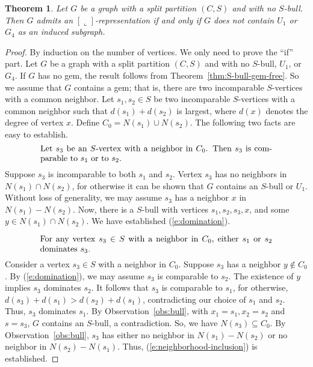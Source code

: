 \documentclass[11pt,3p,times]{elsarticle}
\newenvironment{myproof}{\begin{proof}}{\end{proof}}
\newcommand{\La}{\ensuremath{\llcorner}} \newcommand{\Lb}{\ensuremath{\ulcorner}} \newcommand{\Lc}{\ensuremath{\lrcorner}} \newcommand{\Ld}{\ensuremath{\urcorner}}
\newtheorem{theorem}{Theorem}
\begin{document}
\begin{theorem}\label{thm:bull-free}
Let $G$ be a graph with a split partition $(C,S)$ and with no
$S$-bull. Then $G$ admits an $[\La]$-representation if and only if $G$ does
not contain $U_1$ or $G_4$ as an induced subgraph.
\end{theorem}
\begin{myproof}
By induction on the number of vertices. We
only need to prove the ``if'' part. Let $G$ be a graph with a
split partition $(C,S)$ and with no $S$-bull, $U_1$, or $G_4$.
If $G$ has no gem, the result follows from Theorem~\ref{thm:S-bull-gem-free}.
So we assume that $G$ contains a gem; that is,
there are two incomparable $S$-vertices with a common
neighbor. Let $s_1, s_2 \in S$ be two incomparable $S$-vertices with a
common neighbor such that $d(s_1) + d(s_2)$ is largest, where
$d(x)$ denotes the degree of vertex $x$. Define $C_0 = N(s_1) \cup N(s_2)$.
The following two facts are easy to establish.
\begin{equation}\begin{minipage}{0.8\linewidth}\label{e:domination}
Let $s_3$ be an  $S$-vertex with a neighbor in $C_0$. Then $s_3$ is
comparable to $s_1$ or to $s_2$.
\end{minipage}\end{equation}
Suppose $s_3$ is incomparable
to both $s_1$ and $s_2$. Vertex $s_3$ has no neighbors in $N(s_1)
\cap N(s_2)$, for otherwise it can be shown that $G$ contains
an $S$-bull or $U_1$. Without loss of generality, we may assume
$s_3$ has a neighbor $x$ in $N(s_1) - N(s_2)$. Now, there is a
$S$-bull with vertices $s_1,s_2,s_3,x$, and some $y \in N(s_1)
\cap N(s_2)$. We have established (\ref{e:domination}).


\begin{equation}\begin{minipage}{0.8\linewidth}\label{e:neighborhood-inclusion}
For any vertex $s_3 \in S$ with a neighbor in $C_0$, either $s_1$
or $s_2$ dominates $s_3$.
\end{minipage}\end{equation}
Consider a vertex
$s_3 \in S$ with a neighbor in $C_0$. Suppose $s_3$ has a neighbor
$y \not\in C_0$. By (\ref{e:domination}), we may assume $s_3$ is
comparable to $s_2$. The existence of $y$ implies $s_3$ dominates
$s_2$. It follows that $s_3$ is comparable to $s_1$, for
otherwise, $d(s_3) + d(s_1)
> d(s_2) + d(s_1)$, contradicting our choice of $s_1$ and $s_2$.
Thus, $s_3$ dominates $s_1$. By Observation~\ref{obs:bull}, with
$x_1 = s_1, x_2 = s_2$ and $s =  s_3$, $G$ contains an $S$-bull, a
contradiction. So, we have $N(s_3) \subseteq C_0$. By
Observation~\ref{obs:bull}, $s_3$ has either no neighbor in $N(s_1)-
N(s_2)$ or no neighbor in $N(s_2)- N(s_1)$. Thus,
(\ref{e:neighborhood-inclusion}) is established.


\end{myproof}
\end{document}

